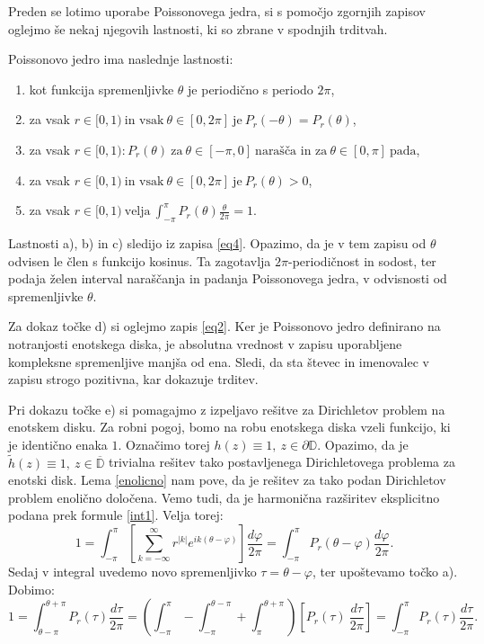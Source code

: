 \documentclass[mat1]{fmfdelo}
\begin{document}
    Preden se lotimo uporabe Poissonovega jedra, si s pomočjo zgornjih zapisov oglejmo še nekaj njegovih lastnosti, ki so zbrane v spodnjih trditvah. 
    
    \begin{trditev}
        \label{lastpk}
        Poissonovo jedro ima naslednje lastnosti:
        \begin{enumerate}[label={\alph*)}]
            \item kot funkcija spremenljivke $\theta$ je periodično s periodo $2\pi$, 
            \item za vsak $r \in [0,1)~\text{in vsak}~\theta \in [0,2\pi]~\text{je}~P_r(-\theta) = P_r(\theta)$,
            \item za vsak $r \in [0,1): P_r(\theta)~\text{za}~\theta \in [-\pi, 0 ]~\text{narašča in za}~\theta \in [0, \pi ]~\text{pada}$,
            \item za vsak $r \in [0,1)~\text{in vsak}~\theta\in [0,2\pi]~\text{je}~P_r(\theta) > 0$,
            \item za vsak $r \in [0,1)~\text{velja}~\int_{-\pi}^{\pi}{P_r(\theta) \frac{\theta}{2\pi}} = 1$.
        \end{enumerate}
    \end{trditev}
    \begin{dokaz}
        Lastnosti a), b) in c) sledijo iz zapisa \eqref{eq4}. Opazimo, da je v tem zapisu od $\theta$ odvisen le člen s funkcijo kosinus. 
        Ta zagotavlja $2\pi$-periodičnost in sodost, ter podaja želen interval naraščanja in padanja Poissonovega jedra, v odvisnosti od spremenljivke $\theta$. 
        
        Za dokaz točke d) si oglejmo zapis \eqref{eq2}. Ker je Poissonovo jedro definirano na notranjosti enotskega diska, je absolutna vrednost v zapisu uporabljene kompleksne spremenljive manjša od ena. 
        Sledi, da sta števec in imenovalec v zapisu strogo pozitivna, kar dokazuje trditev. 

        Pri dokazu točke e) si pomagajmo z izpeljavo rešitve za Dirichletov problem na enotskem disku. 
        Za robni pogoj, bomo na robu enotskega diska vzeli funkcijo, ki je identično enaka $1$. Označimo torej $h(z) \equiv 1,~ z \in \partial \mathbb{D}$. Opazimo, da je \mbox{$\widetilde{h}(z) \equiv 1,~z \in \overline{\mathbb{D}}$} trivialna rešitev tako postavljenega Dirichletovega problema za enotski disk.
        Lema \ref{enolicno} nam pove, da je rešitev za tako podan Dirichletov problem enolično določena. Vemo tudi, da je harmonična razširitev eksplicitno podana prek formule \eqref{int1}.
        Velja torej:
        $$
        1 = \int_{-\pi}^{\pi}{\left[\sum_{k=-\infty}^{\infty}{r^{|k|} e^{ik(\theta - \varphi)}}\right] \frac{d \varphi}{2 \pi}} = \int_{-\pi}^{\pi}{P_r(\theta - \varphi)\frac{d \varphi}{2 \pi}}. 
        $$
        Sedaj v integral uvedemo novo spremenljivko $\tau = \theta - \varphi$, ter upoštevamo točko a). Dobimo: 
        $$
        1 = \int_{\theta - \pi}^{\theta + \pi}{P_r(\tau)\frac{d \tau}{2 \pi}} = \left(\int_{-\pi}^{\pi} - \int_{-\pi}^{\theta -\pi} + \int_{\pi}^{\theta + \pi}\right)\left[ P_r(\tau)~\frac{d\tau}{2 \pi}\right] = \int_{-\pi}^{\pi}{P_r(\tau)\frac{d \tau}{2 \pi}}.
        $$
    \end{dokaz}
\end{document}
